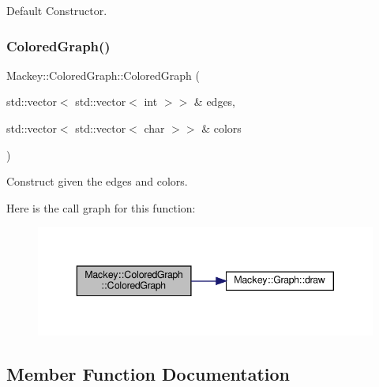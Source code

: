 Default Constructor. 

\mbox{\label{classMackey_1_1ColoredGraph_adada856cdbfc508b2df15919f45a1808}} 
\subsubsection{\texorpdfstring{Colored\+Graph()}{ColoredGraph()}\hspace{0.1cm}{\footnotesize\ttfamily [2/2]}}
{\footnotesize\ttfamily Mackey\+::\+Colored\+Graph\+::\+Colored\+Graph (\begin{DoxyParamCaption}\item[{std\+::vector$<$ std\+::vector$<$ int $>$$>$ \&}]{edges,  }\item[{std\+::vector$<$ std\+::vector$<$ char $>$$>$ \&}]{colors }\end{DoxyParamCaption})\hspace{0.3cm}{\ttfamily [inline]}}



Construct given the edges and colors. 

Here is the call graph for this function\+:\nopagebreak
\begin{figure}[H]
\begin{center}
\leavevmode
\includegraphics[width=343pt]{classMackey_1_1ColoredGraph_adada856cdbfc508b2df15919f45a1808_cgraph}
\end{center}
\end{figure}


\subsection{Member Function Documentation}
\mbox{\label{classMackey_1_1ColoredGraph_a8ed05073805b34a0087a7ed94e889694}} 
